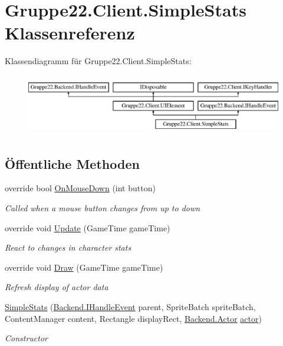 \hypertarget{class_gruppe22_1_1_client_1_1_simple_stats}{\section{Gruppe22.\-Client.\-Simple\-Stats Klassenreferenz}
\label{class_gruppe22_1_1_client_1_1_simple_stats}
}
Klassendiagramm für Gruppe22.\-Client.\-Simple\-Stats\-:\begin{figure}[H]
\begin{center}
\leavevmode
\includegraphics[height=2.692308cm]{class_gruppe22_1_1_client_1_1_simple_stats}
\end{center}
\end{figure}
\subsection*{Öffentliche Methoden}
\begin{DoxyCompactItemize}
\item 
override bool \hyperlink{class_gruppe22_1_1_client_1_1_simple_stats_adef63cea6f4c63a0d9b8c6a07b54a871}{On\-Mouse\-Down} (int button)
\begin{DoxyCompactList}\small\item\em Called when a mouse button changes from up to down \end{DoxyCompactList}\item 
override void \hyperlink{class_gruppe22_1_1_client_1_1_simple_stats_a2caae8c55a4ddde3fd3605d980d6cdaa}{Update} (Game\-Time game\-Time)
\begin{DoxyCompactList}\small\item\em React to changes in character stats \end{DoxyCompactList}\item 
override void \hyperlink{class_gruppe22_1_1_client_1_1_simple_stats_a3fcb27fbe6cf2fce3c6fe4215de147d2}{Draw} (Game\-Time game\-Time)
\begin{DoxyCompactList}\small\item\em Refresh display of actor data \end{DoxyCompactList}\item 
\hyperlink{class_gruppe22_1_1_client_1_1_simple_stats_a5a8d67799cbb72eb3208eb92990e7279}{Simple\-Stats} (\hyperlink{interface_gruppe22_1_1_backend_1_1_i_handle_event}{Backend.\-I\-Handle\-Event} parent, Sprite\-Batch sprite\-Batch, Content\-Manager content, Rectangle display\-Rect, \hyperlink{class_gruppe22_1_1_backend_1_1_actor}{Backend.\-Actor} \hyperlink{class_gruppe22_1_1_client_1_1_simple_stats_a49b12e4d4fc1845f976ea160109663fb}{actor})
\begin{DoxyCompactList}\small\item\em Constructor \end{DoxyCompactList}\end{DoxyCompactItemize}
